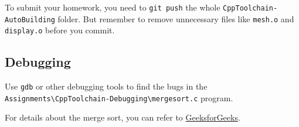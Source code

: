 \documentclass[english]{../TexTemplate/thesis}
\begin{document}
\bigskip
To submit your homework, you need to \verb'git push' the whole \verb'CppToolchain-AutoBuilding' folder.
But remember to remove unnecessary files like \verb'mesh.o' and \verb'display.o' before you commit.

\subsection{Debugging}
Use \verb'gdb' or other debugging tools to find the bugs in the\\
\verb'Assignments\CppToolchain-Debugging\mergesort.c' program.

For details about the merge sort, you can refer to \href{https://www.geeksforgeeks.org/merge-sort/}{GeeksforGeeks}.
\end{document}

